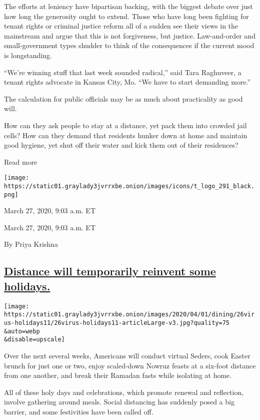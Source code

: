 The efforts at leniency have bipartisan backing, with the biggest debate
over just how long the generosity ought to extend. Those who have long
been fighting for tenant rights or criminal justice reform all of a
sudden see their views in the mainstream and argue that this is not
forgiveness, but justice. Law-and-order and small-government types
shudder to think of the consequences if the current mood is
longstanding.

``We're winning stuff that last week sounded radical,'' said Tara
Raghuveer, a tenant rights advocate in Kansas City, Mo. ``We have to
start demanding more.''

The calculation for public officials may be as much about practicality
as good will.

How can they ask people to stay at a distance, yet pack them into
crowded jail cells? How can they demand that residents hunker down at
home and maintain good hygiene, yet shut off their water and kick them
out of their residences?

Read more

\texttt{[image: https://static01.graylady3jvrrxbe.onion/images/icons/t\_logo\_291\_black.png]}

March 27, 2020, 9:03 a.m. ET

March 27, 2020, 9:03 a.m. ET

By Priya Krishna

\hypertarget{distance-will-temporarily-reinvent-some-holidays}{%
\subsection{\texorpdfstring{\protect\hyperlink{distance-will-temporarily-reinvent-some-holidays}{Distance
will temporarily reinvent some
holidays.}}{Distance will temporarily reinvent some holidays.}}\label{distance-will-temporarily-reinvent-some-holidays}}

\texttt{[image: https://static01.graylady3jvrrxbe.onion/images/2020/04/01/dining/26virus-holidays11/26virus-holidays11-articleLarge-v3.jpg?quality=75\\\&auto=webp\\\&disable=upscale]}

Over the next several weeks, Americans will conduct virtual Seders, cook
Easter brunch for just one or two, enjoy scaled-down Nowruz feasts at a
six-foot distance from one another, and break their Ramadan fasts while
isolating at home.

All of these holy days and celebrations, which promote renewal and
reflection, involve gathering around meals. Social distancing has
suddenly posed a big barrier, and some festivities have been called off.

